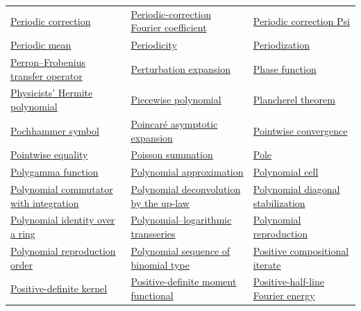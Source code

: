 \documentclass[11pt,oneside]{article}
\begin{document}
\begin{longtable}{L{0.31\textwidth}L{0.31\textwidth}L{0.31\textwidth}}
\hyperlink{gls:periodic-correction}{Periodic correction} & \hyperlink{gls:periodic-fourier-coefficient}{Periodic-correction Fourier coefficient} & \hyperlink{gls:periodic-correction-psi}{Periodic correction Psi} \\
\hyperlink{gls:periodic-mean}{Periodic mean} & \hyperlink{gls:periodicity}{Periodicity} & \hyperlink{gls:periodization}{Periodization} \\
\hyperlink{gls:perron-frobenius-operator}{Perron--Frobenius transfer operator} & \hyperlink{gls:perturbation-expansion}{Perturbation expansion} & \hyperlink{gls:phase-function}{Phase function} \\
\hyperlink{gls:physicists-hermite-polynomial}{Physicists' Hermite polynomial} & \hyperlink{gls:piecewise-polynomial}{Piecewise polynomial} & \hyperlink{gls:plancherel-theorem}{Plancherel theorem} \\
\hyperlink{gls:pochhammer-symbol}{Pochhammer symbol} & \hyperlink{gls:poincare-asymptotic-expansion}{Poincaré asymptotic expansion} & \hyperlink{gls:pointwise-convergence}{Pointwise convergence} \\
\hyperlink{gls:pointwise-equality}{Pointwise equality} & \hyperlink{gls:poisson-summation}{Poisson summation} & \hyperlink{gls:pole}{Pole} \\
\hyperlink{gls:polygamma-function}{Polygamma function} & \hyperlink{gls:polynomial-approximation}{Polynomial approximation} & \hyperlink{gls:polynomial-cell}{Polynomial cell} \\
\hyperlink{gls:polynomial-commutator}{Polynomial commutator with integration} & \hyperlink{gls:polynomial-deconvolution}{Polynomial deconvolution by the up-law} & \hyperlink{gls:polynomial-diagonal-stabilization}{Polynomial diagonal stabilization} \\
\hyperlink{gls:ring-polynomial-identity}{Polynomial identity over a ring} & \hyperlink{gls:polynomial-logarithmic-transseries}{Polynomial--logarithmic transseries} & \hyperlink{gls:polynomial-reproduction}{Polynomial reproduction} \\
\hyperlink{gls:polynomial-reproduction-order}{Polynomial reproduction order} & \hyperlink{gls:binomial-type-sequence}{Polynomial sequence of binomial type} & \hyperlink{gls:positive-compositional-iterate}{Positive compositional iterate} \\
\hyperlink{gls:positive-definite-kernel}{Positive-definite kernel} & \hyperlink{gls:positive-definite-moment-functional}{Positive-definite moment functional} & \hyperlink{gls:positive-half-line-fourier-energy}{Positive-half-line Fourier energy} \\

\end{longtable}
\end{document}
